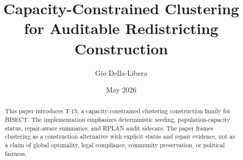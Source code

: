 \documentclass[12pt]{article}
\title{Capacity-Constrained Clustering for Auditable Redistricting Construction}
\author{Gio Della-Libera}
\date{May 2026}
\begin{document}
\maketitle

\begin{abstract}
This paper introduces T.15, a capacity-constrained clustering construction
family for BISECT. The implementation emphasizes deterministic seeding,
population-capacity status, repair-aware summaries, and RPLAN audit sidecars.
The paper frames clustering as a construction alternative with explicit status
and repair evidence, not as a claim of global optimality, legal compliance,
community preservation, or political fairness.
\end{abstract}









\nocite{bisect-t15-spec}


\end{document}
